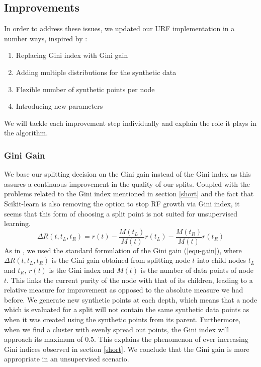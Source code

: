 \documentclass[conference]{IEEEtran}
\begin{document}
\subsection{Improvements}
In order to address these issues, we updated our URF implementation in a number ways, inspired by \cite{Kruber2019UnsupervisedAS}:
\begin{enumerate}
\item Replacing Gini index with Gini gain
\item Adding multiple distributions for the synthetic data
\item Flexible number of synthetic points per node
\item Introducing new parameters
\end{enumerate}
We will tackle each improvement step individually and explain the role it plays in the algorithm.
\\
\subsubsection{Gini Gain}
We base our splitting decision on the Gini gain instead of the Gini index as this assures a continuous improvement in the quality of our splits. Coupled with the problems related to the Gini index mentioned in section \ref{short} and the fact that Scikit-learn \cite{sklearn_api} is also removing the option to stop RF growth via Gini index, it seems that this form of choosing a split point is not suited for unsupervised learning.
\begin{equation}\label{equ-gain}
\Delta R(t, t_L, t_R)= r(t) - \frac{M(t_L)}{M(t)}r(t_L) - \frac{M(t_R)}{M(t)}r(t_R)
\end{equation}
As in \cite{Kruber2019UnsupervisedAS}, we used the standard formulation of the Gini gain (\ref{equ-gain}), where $\Delta R(t, t_L, t_R)$ is the Gini gain obtained from splitting node $t$ into child nodes $t_L$ and $t_R$, $r(t)$ is the Gini index  and $M(t)$ is the number of data points of node $t$. This links the current purity of the node with that of its children, leading to a relative measure for improvement as opposed to the absolute measure we had before. We generate new synthetic points at each depth, which means that a node which is evaluated for a split will not contain the same synthetic data points as when it was created using the synthetic points from its parent. Furthermore, when we find a cluster with evenly spread out points, the Gini index will approach its maximum of $0.5$. This explains the phenomenon of ever increasing Gini indices observed in section \ref{short}. We conclude that the Gini gain is more appropriate in an unsupervised scenario.
\\
\end{document}
